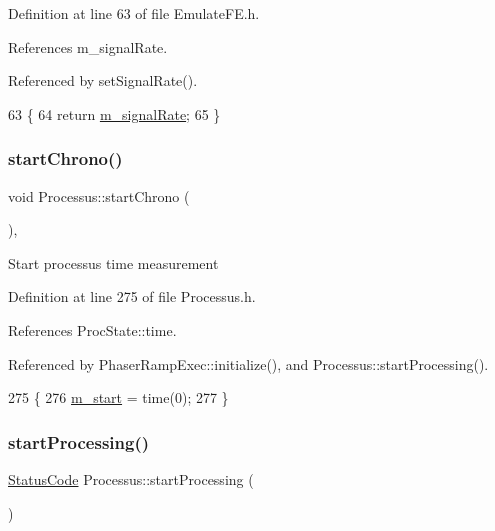 Definition at line 63 of file Emulate\+F\+E.\+h.



References m\+\_\+signal\+Rate.



Referenced by set\+Signal\+Rate().


\begin{DoxyCode}
63                     \{
64     \textcolor{keywordflow}{return} \hyperlink{classEmulateFE_a7aeff9e62f850ca6d7ee27dce02a060b}{m\_signalRate};
65   \}
\end{DoxyCode}
\mbox{\label{classProcessus_a5e4d34b86241fa0756e07375a14ff4b2}} 
\subsubsection{\texorpdfstring{start\+Chrono()}{startChrono()}}
{\footnotesize\ttfamily void Processus\+::start\+Chrono (\begin{DoxyParamCaption}{ }\end{DoxyParamCaption})\hspace{0.3cm}{\ttfamily [inline]}, {\ttfamily [inherited]}}

Start processus time measurement 

Definition at line 275 of file Processus.\+h.



References Proc\+State\+::time.



Referenced by Phaser\+Ramp\+Exec\+::initialize(), and Processus\+::start\+Processing().


\begin{DoxyCode}
275                     \{
276     \hyperlink{classProcessus_a8ec00b2e12c5beada932610f30218e93}{m\_start} = time(0);
277   \}
\end{DoxyCode}
\mbox{\label{classProcessus_a09319bde9bed93e290f69b4e04585543}} 
\subsubsection{\texorpdfstring{start\+Processing()}{startProcessing()}}
{\footnotesize\ttfamily \hyperlink{classStatusCode}{Status\+Code} Processus\+::start\+Processing (\begin{DoxyParamCaption}{ }\end{DoxyParamCaption})\hspace{0.3cm}{\ttfamily [inherited]}}

